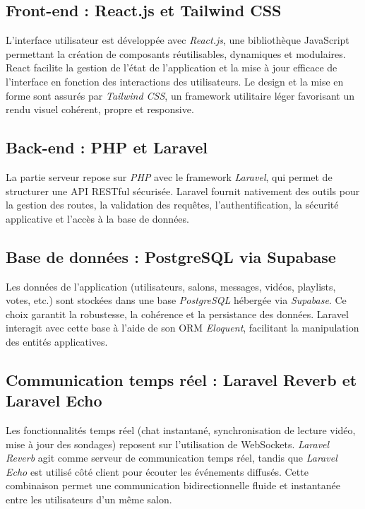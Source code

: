 \documentclass[12pt,a4paper]{report}
\begin{document}
\subsection{Front-end : React.js et Tailwind CSS}
L’interface utilisateur est développée avec \textit{React.js}, une bibliothèque JavaScript permettant la création de composants réutilisables, dynamiques et modulaires. React facilite la gestion de l’état de l’application et la mise à jour efficace de l’interface en fonction des interactions des utilisateurs.  
Le design et la mise en forme sont assurés par \textit{Tailwind CSS}, un framework utilitaire léger favorisant un rendu visuel cohérent, propre et responsive.

\subsection{Back-end : PHP et Laravel}
La partie serveur repose sur \textit{PHP} avec le framework \textit{Laravel}, qui permet de structurer une API RESTful sécurisée. Laravel fournit nativement des outils pour la gestion des routes, la validation des requêtes, l’authentification, la sécurité applicative et l’accès à la base de données.

\subsection{Base de données : PostgreSQL via Supabase}
Les données de l’application (utilisateurs, salons, messages, vidéos, playlists, votes, etc.) sont stockées dans une base \textit{PostgreSQL} hébergée via \textit{Supabase}. Ce choix garantit la robustesse, la cohérence et la persistance des données. Laravel interagit avec cette base à l’aide de son ORM \textit{Eloquent}, facilitant la manipulation des entités applicatives.

\subsection{Communication temps réel : Laravel Reverb et Laravel Echo}
Les fonctionnalités temps réel (chat instantané, synchronisation de lecture vidéo, mise à jour des sondages) reposent sur l’utilisation de WebSockets. \textit{Laravel Reverb} agit comme serveur de communication temps réel, tandis que \textit{Laravel Echo} est utilisé côté client pour écouter les événements diffusés. Cette combinaison permet une communication bidirectionnelle fluide et instantanée entre les utilisateurs d’un même salon.
\end{document}

